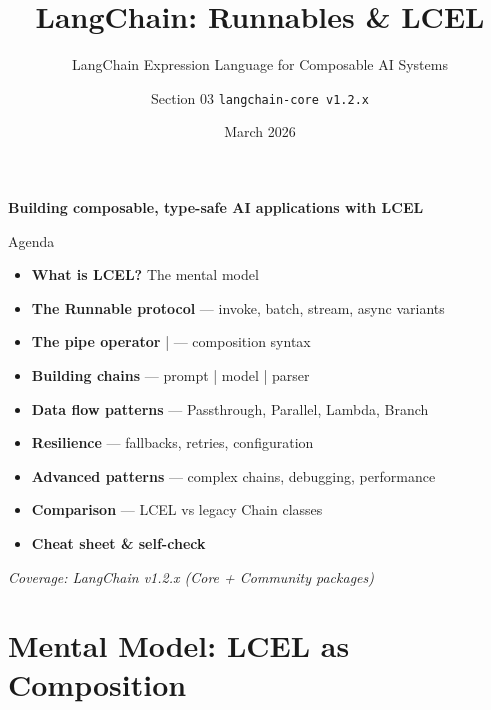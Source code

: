 \documentclass[aspectratio=169,11pt]{beamer}
\title{LangChain: Runnables \& LCEL}
\subtitle{LangChain Expression Language for Composable AI Systems}
\author{Section 03 \texttt{langchain-core v1.2.x}}
\date{March 2026}
\begin{document}
\begin{frame}
  \titlepage
  \vspace{0.3em}
  \begin{center}
    {\color{lcblue}\textbf{Building composable, type-safe AI applications with LCEL}}
  \end{center}
\end{frame}

\begin{frame}{Agenda}
  \begin{itemize}\setlength{\itemsep}{1pt}
    \item \textbf{What is LCEL?} The mental model
    \item \textbf{The Runnable protocol} — invoke, batch, stream, async variants
    \item \textbf{The pipe operator} |  — composition syntax
    \item \textbf{Building chains} — prompt | model | parser
    \item \textbf{Data flow patterns} — Passthrough, Parallel, Lambda, Branch
    \item \textbf{Resilience} — fallbacks, retries, configuration
    \item \textbf{Advanced patterns} — complex chains, debugging, performance
    \item \textbf{Comparison} — LCEL vs legacy Chain classes
    \item \textbf{Cheat sheet \& self-check}
  \end{itemize}
  \vspace{0.3em}
  \small \textit{Coverage: LangChain v1.2.x (Core + Community packages)}
\end{frame}

\section{Mental Model: LCEL as Composition}
\end{document}
